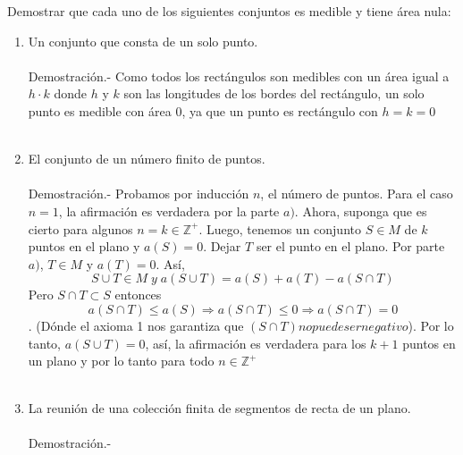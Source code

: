 \begin{teo}
Demostrar que cada uno de los siguientes conjuntos es medible y tiene área nula:
\begin{enumerate}[\bfseries a)]
\item Un conjunto que consta de un solo punto.\\\\
Demostración.- \;  Como todos los rectángulos son medibles con un área igual a $h\cdot k$ donde $h$ \; y \; $k$ son las longitudes de los bordes del rectángulo, un solo punto es medible con área $0$, ya que un punto es rectángulo con $h=k=0$\\\\ 

\item El conjunto de un número finito de puntos.\\\\
Demostración.- \; Probamos por inducción $n$, el número de puntos. Para el caso $n=1$, la afirmación es verdadera por la parte $a)$. Ahora, suponga que es cierto para algunos $n = k \in \mathbb{Z}^{+}$. Luego, tenemos un conjunto $S \in M$ de $k$ puntos en el plano y $a(S)=0$. Dejar $T$ ser el punto en el plano. Por parte $a)$, $T \in M$ y $a(T)=0.$ Así,
$$S \cup T \in M \; y \; a(S \cup T) = a(S) + a(T) - a(S \cap T)$$
Pero $S \cap T \subset S$ entonces $$a(S \cap T) \leq a(S) \Rightarrow a(S \cap T) \leq 0 \Rightarrow a(S \cap T)=0$$.
(Dónde el axioma 1 nos garantiza que $(S \cap T) no puede ser negativo$). Por lo tanto, $a(S \cup T)=0$, así, la afirmación es verdadera para los $k+1$ puntos en un plano y por lo tanto para todo $n \in \mathbb{Z}^+$\\\\

\item La reunión de una colección finita de segmentos de recta de un plano. \\\\
Demostración.- \;   \\\\
\end{enumerate}
\end{teo}